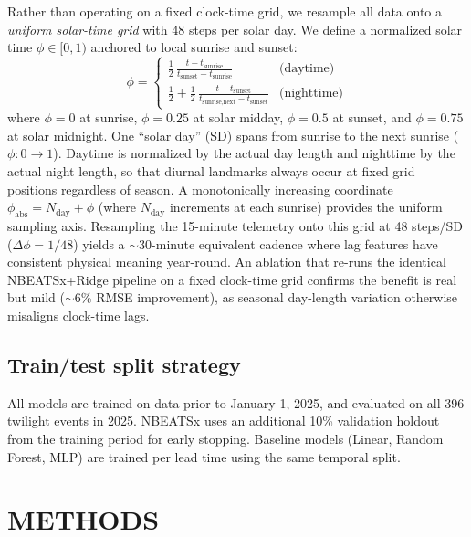 \documentclass[]{spie}  %
\begin{document}
Rather than operating on a fixed clock-time grid, we resample all data onto a \emph{uniform solar-time grid} with 48 steps per solar day. We define a normalized solar time $\phi \in [0,1)$ anchored to local sunrise and sunset:
\begin{equation}
\phi = \begin{cases}
\displaystyle \frac{1}{2}\,\frac{t - t_{\text{sunrise}}}{t_{\text{sunset}} - t_{\text{sunrise}}} & \text{(daytime)} \\[8pt]
\displaystyle \frac{1}{2} + \frac{1}{2}\,\frac{t - t_{\text{sunset}}}{t_{\text{sunrise,next}} - t_{\text{sunset}}} & \text{(nighttime)}
\end{cases}
\label{eq:solar_time}
\end{equation}
where $\phi = 0$ at sunrise, $\phi = 0.25$ at solar midday, $\phi = 0.5$ at sunset, and $\phi = 0.75$ at solar midnight. One ``solar day'' (SD) spans from sunrise to the next sunrise ($\phi: 0 \to 1$). Daytime is normalized by the actual day length and nighttime by the actual night length, so that diurnal landmarks always occur at fixed grid positions regardless of season. A monotonically increasing coordinate $\phi_{\text{abs}} = N_{\text{day}} + \phi$ (where $N_{\text{day}}$ increments at each sunrise) provides the uniform sampling axis. Resampling the 15-minute telemetry onto this grid at 48 steps/SD ($\Delta\phi = 1/48$) yields a $\sim$30-minute equivalent cadence where lag features have consistent physical meaning year-round. An ablation that re-runs the identical NBEATSx+Ridge pipeline on a fixed clock-time grid confirms the benefit is real but mild ($\sim$6\% RMSE improvement), as seasonal day-length variation otherwise misaligns clock-time lags.

\subsection{Train/test split strategy}
\label{sec:data:split}

All models are trained on data prior to January 1, 2025, and evaluated on all 396 twilight events in 2025. NBEATSx uses an additional 10\% validation holdout from the training period for early stopping. Baseline models (Linear, Random Forest, MLP) are trained per lead time using the same temporal split.

\section{METHODS}
\label{sec:methods}
\end{document}
